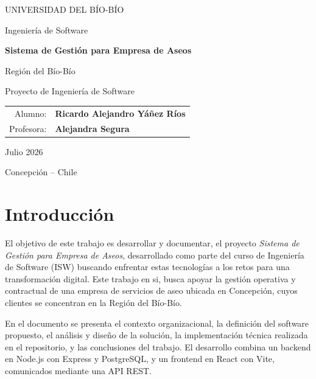 \documentclass[12pt,a4paper]{report}
\begin{document}
\begin{titlepage}
  \centering
  \vspace*{2cm}
  {\Large UNIVERSIDAD DEL BÍO-BÍO\par}
  \vspace{0.5cm}
  {\large Ingeniería de Software\par}
  \vspace{3cm}
  {\huge\bfseries Sistema de Gestión para Empresa de Aseos\par}
  \vspace{0.5cm}
  {\Large Región del Bío-Bío\par}
  \vspace{2cm}
  {\large Proyecto de Ingeniería de Software\par}
  \vspace{3cm}
\begin{center}
\begin{tabular}{r l}
  Alumno: & \textbf{Ricardo Alejandro Yáñez Ríos} \\
  
  Profesora: & \textbf{Alejandra Segura}
\end{tabular}
\end{center}
  \vfill
  {\large Julio 2026\par}
  Concepción -- Chile
\end{titlepage}

\tableofcontents
\listoffigures
\listoftables
\clearpage
{}

\clearpage
\chapter{Introducción}

El objetivo de este trabajo es desarrollar y documentar, el proyecto \textit{Sistema de Gestión para Empresa de Aseos}, desarrollado como parte del curso de Ingeniería de Software (ISW) buscando enfrentar estas tecnologías a los retos para una transformación digital. Este trabajo en si, busca apoyar la gestión operativa y contractual de una empresa de servicios de aseo ubicada en Concepción, cuyos clientes se concentran en la Región del Bío-Bío.

En el documento se presenta el contexto organizacional, la definición del software propuesto, el análisis y diseño de la solución, la implementación técnica realizada en el repositorio, y las conclusiones del trabajo. El desarrollo combina un backend en Node.js con Express y PostgreSQL, y un frontend en React con Vite, comunicados mediante una API REST.
\end{document}
